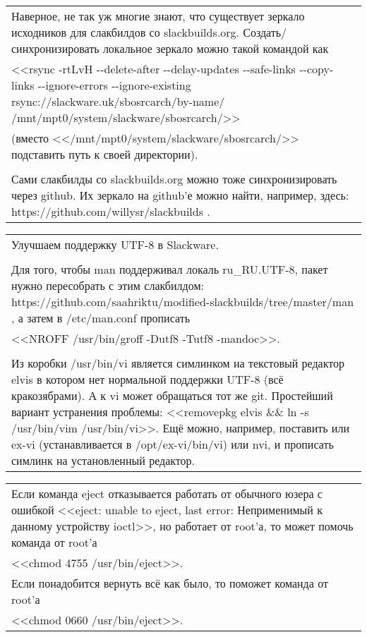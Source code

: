 \documentclass[14pt,openany]{book}
\begin{document}
\begin{center}
\begin{tabular}{|p{\textwidth}|}
\hline
Наверное, не так уж многие знают, что существует зеркало исходников для слакбилдов со slackbuilds.org. Создать/синхронизировать локальное зеркало можно такой командой как \\
<<rsync -rtLvH -{}-delete-after -{}-delay-updates -{}-safe-links -{}-copy-links -{}-ignore-errors -{}-ignore-existing rsync://slackware.uk/sbosrcarch/by-name/ /mnt/mpt0/system/slackware/sbosrcarch/>> \\
(вместо <</mnt/mpt0/system/slackware/sbosrcarch/>> подставить путь к своей директории). \\
 \\
Сами слакбилды со slackbuilds.org можно тоже синхронизировать через github. Их зеркало на github'е можно найти, например, здесь: https://github.com/willysr/slackbuilds . \\
\end{tabular}
\begin{tabular}{|p{\textwidth}|}
\hline
Улучшаем поддержку UTF-8 в Slackware. \\
 \\
Для того, чтобы man поддерживал локаль ru\_RU.UTF-8, пакет нужно пересобрать с этим слакбилдом: https://github.com/saahriktu/modified-slackbuilds/tree/master/man , а затем в /etc/man.conf прописать \\
<<NROFF /usr/bin/groff -Dutf8 -Tutf8 -mandoc>>. \\
 \\
Из коробки /usr/bin/vi является симлинком на текстовый редактор elvis в котором нет нормальной поддержки UTF-8 (всё кракозябрами). А к vi может обращаться тот же git. Простейший вариант устранения проблемы: <<removepkg elvis \&\& ln -s /usr/bin/vim /usr/bin/vi>>. Ещё можно, например, поставить или ex-vi (устанавливается в /opt/ex-vi/bin/vi) или nvi, и прописать симлинк на установленный редактор. \\
\end{tabular}
\begin{tabular}{|p{\textwidth}|}
\hline
Если команда eject отказывается работать от обычного юзера с ошибкой <<eject: unable to eject, last error: Неприменимый к данному устройству ioctl>>, но работает от root'а, то может помочь команда от root'а \\
<<chmod 4755 /usr/bin/eject>>. \\
Если понадобится вернуть всё как было, то поможет команда от root'а \\
<<chmod 0660 /usr/bin/eject>>. \\
\end{tabular}

\end{center}
\end{document}
